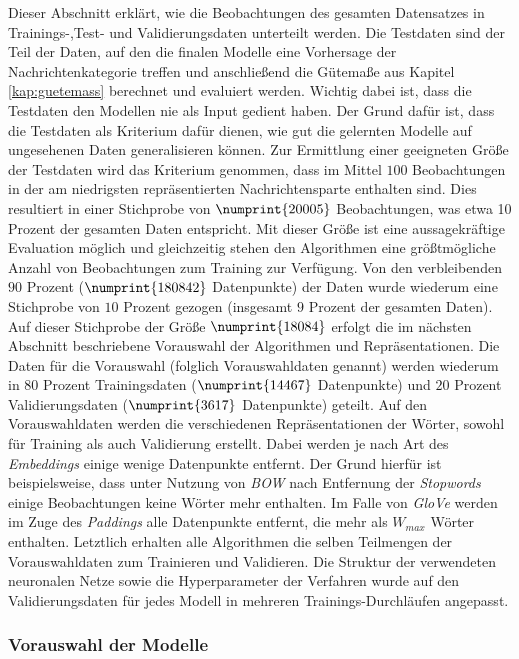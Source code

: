 \documentclass[a4paper,11pt]{article}
\begin{document}
Dieser Abschnitt erklärt, wie die  Beobachtungen des gesamten Datensatzes in \\
Trainings-,Test- und Validierungsdaten unterteilt werden.
Die Testdaten sind der Teil der Daten, auf den die finalen Modelle eine Vorhersage der Nachrichtenkategorie treffen und anschließend die Gütemaße aus Kapitel \ref{kap:guetemass} berechnet und evaluiert werden. Wichtig dabei ist, dass die Testdaten den Modellen nie als Input gedient haben. Der Grund dafür ist, dass die Testdaten als Kriterium dafür dienen, wie gut die gelernten Modelle auf ungesehenen Daten generalisieren können. Zur Ermittlung einer geeigneten Größe der Testdaten wird das Kriterium genommen, dass im Mittel $100$ Beobachtungen in der am niedrigsten repräsentierten Nachrichtensparte enthalten sind. Dies resultiert in einer Stichprobe von $\numprint{20005}$ Beobachtungen, was etwa 10 Prozent der gesamten Daten entspricht. 
Mit dieser Größe ist eine aussagekräftige Evaluation möglich und gleichzeitig stehen den Algorithmen eine größtmögliche Anzahl von Beobachtungen zum Training zur Verfügung. Von den verbleibenden $90$ Prozent ($\numprint{180842}$ Datenpunkte) der Daten wurde wiederum eine Stichprobe von $10$ Prozent gezogen (insgesamt $9$ Prozent der gesamten Daten). Auf dieser Stichprobe der Größe $\numprint{18084}$ erfolgt die im nächsten Abschnitt beschriebene Vorauswahl der Algorithmen und Repräsentationen. Die Daten für die Vorauswahl (folglich Vorauswahldaten genannt) werden wiederum in $80$ Prozent Trainingsdaten ($\numprint{14467}$ Datenpunkte) und $20$ Prozent  Validierungsdaten ($\numprint{3617}$ Datenpunkte) geteilt. Auf den Vorauswahldaten werden die verschiedenen Repräsentationen der Wörter, sowohl für Training als auch Validierung erstellt. Dabei werden je nach Art des \textit{Embeddings} einige wenige Datenpunkte entfernt. Der Grund hierfür ist beispielsweise, dass  unter Nutzung von \textit{BOW} nach Entfernung der \textit{Stopwords} einige Beobachtungen keine Wörter mehr enthalten. Im Falle von \textit{GloVe} werden im Zuge des \textit{Paddings} alle Datenpunkte entfernt, die mehr als $W_{max}$ Wörter enthalten.
Letztlich erhalten alle Algorithmen die selben Teilmengen der Vorauswahldaten zum Trainieren und Validieren. Die Struktur der verwendeten neuronalen Netze sowie die Hyperparameter der Verfahren wurde auf den Validierungsdaten für jedes Modell in mehreren Trainings-Durchläufen angepasst.

\subsubsection{Vorauswahl der Modelle}\label{kap:preselection}
\end{document}
